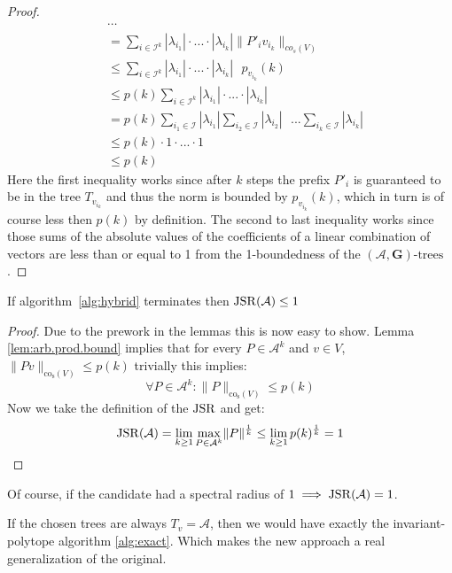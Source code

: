 \begin{proof}
$$\begin{aligned}
  & \cdots \\
  & = \sum \limits_{i \in \mathcal{I}^{k}} |\lambda_{i_1}| \cdot ... \cdot |\lambda_{i_k}| \|P'_{i}v_{i_{k}} \|_{co_s(V)}\\
  & \leq \sum \limits_{i \in \mathcal{I}^{k}} |\lambda_{i_1}| \cdot ... \cdot |\lambda_{i_k}| \text{ } p_{v_{i_k}}(k) \\
  & \leq p(k)\sum \limits_{i \in \mathcal{I}^{k}} |\lambda_{i_1}| \cdot ... \cdot |\lambda_{i_k}| \\
  & =  p(k)\sum \limits_{i_1 \in \mathcal{I}} |\lambda_{i_1}| \sum \limits_{i_2 \in \mathcal{I}} |\lambda_{i_2}| \text{ } ... \sum \limits_{i_k \in \mathcal{I}} |\lambda_{i_k}| \\
  & \leq p(k) \cdot 1 \cdot ... \cdot 1\\
  & \leq p(k)
\end{aligned}
$$
Here the first inequality works since after $k$ steps the prefix $P'_{i}$ is guaranteed to be in the tree $T_{v_{i_k}}$ and thus the norm is bounded by $p_{v_{i_k}}(k)$, which in turn is of course less then $p(k)$ by definition. The second to last inequality works since those sums of the absolute values of the coefficients of a linear combination of vectors are less than or equal to 1 from the 1-boundedness of the $(\mathcal{A},\mathbf{G})\text{-trees}$.
\end{proof}

\begin{theorem}{}\label{thm:hybrid-found}
If algorithm~\ref{alg:hybrid} terminates then $\operatorname{JSR}(\mathcal{A}) \leq 1$
\end{theorem}

\begin{proof}
  Due to the prework in the lemmas this is now easy to show. 
  Lemma \ref{lem:arb.prod.bound} implies that for every $P \in \mathcal{A}^k$ and $v \in V$, $\lVert Pv \rVert _{\text{co}_{\text{s}}(V)} \le p(k)$
  trivially this implies: 
  $$
    \forall P \in \mathcal{A}^k: \lVert P \rVert _{\text{co}_{\text{s}}(V)} \le p(k)
  $$
  Now we take the definition of the $\operatorname{JSR}$ and get:
  $$
    \operatorname{JSR}(\mathcal{A}) = \lim_{k \geq 1} \max_{P \in \mathcal{A}^k} \lVert P \rVert^\frac{1}{k} \le \lim_{k \geq 1} p(k)^\frac{1}{k} = 1
  $$ 
\end{proof}

Of course, if the candidate had a spectral radius of $1 \implies \operatorname{JSR}(\mathcal{A}) = 1$.

\begin{corollary}
  If the chosen trees are always $T_v = \mathcal{A}$, then we would have exactly the invariant-polytope algorithm \ref{alg:exact}. 
  Which makes the new approach a real generalization of the original. \\
\end{corollary}

